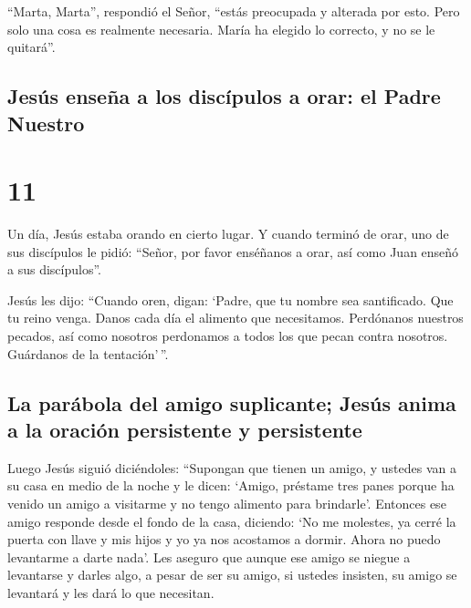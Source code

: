  ``Marta, Marta'', respondió el Señor, ``estás preocupada
y alterada por esto.  Pero solo una cosa es realmente
necesaria. María ha elegido lo correcto, y no se le quitará''.

\hypertarget{jesuxfas-enseuxf1a-a-los-discuxedpulos-a-orar-el-padre-nuestro}{%
\subsection{Jesús enseña a los discípulos a orar: el Padre
Nuestro}\label{jesuxfas-enseuxf1a-a-los-discuxedpulos-a-orar-el-padre-nuestro}}

\hypertarget{section-10}{%
\section{11}\label{section-10}}

 Un día, Jesús estaba orando en cierto lugar. Y cuando
terminó de orar, uno de sus discípulos le pidió: ``Señor, por favor
enséñanos a orar, así como Juan enseñó a sus discípulos''.

 Jesús les dijo: ``Cuando oren, digan: `Padre, que tu
nombre sea santificado. Que tu reino venga.  Danos cada
día el alimento que necesitamos.  Perdónanos nuestros
pecados, así como nosotros perdonamos a todos los que pecan contra
nosotros. Guárdanos de la tentación'\,''.

\hypertarget{la-paruxe1bola-del-amigo-suplicante-jesuxfas-anima-a-la-oraciuxf3n-persistente-y-persistente}{%
\subsection{La parábola del amigo suplicante; Jesús anima a la oración
persistente y
persistente}\label{la-paruxe1bola-del-amigo-suplicante-jesuxfas-anima-a-la-oraciuxf3n-persistente-y-persistente}}

 Luego Jesús siguió diciéndoles: ``Supongan que tienen un
amigo, y ustedes van a su casa en medio de la noche y le dicen: `Amigo,
préstame tres panes  porque ha venido un amigo a visitarme
y no tengo alimento para brindarle'.  Entonces ese amigo
responde desde el fondo de la casa, diciendo: `No me molestes, ya cerré
la puerta con llave y mis hijos y yo ya nos acostamos a dormir. Ahora no
puedo levantarme a darte nada'.  Les aseguro que aunque
ese amigo se niegue a levantarse y darles algo, a pesar de ser su amigo,
si ustedes insisten, su amigo se levantará y les dará lo que necesitan.

